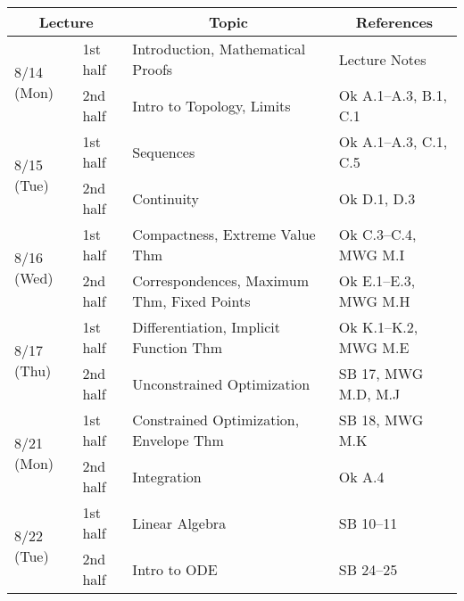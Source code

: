 \documentclass[11pt]{article}
\begin{document}
\begin{tabularx}{\columnwidth}{llll}
  \toprule
  \multicolumn{2}{c}{Lecture}
  &
  \multicolumn{1}{c}{Topic}
  &
  \multicolumn{1}{c}{References}
                                                                                                                 \\\midrule
  \multirow{2}{*}{8/14 (Mon)} & 1st half & Introduction, Mathematical Proofs          & Lecture Notes         \\
                              & 2nd half & Intro to Topology, Limits                  & Ok A.1--A.3, B.1, C.1 \\ [6pt]
  \multirow{2}{*}{8/15 (Tue)} & 1st half & Sequences                                  & Ok A.1--A.3, C.1, C.5 \\
                              & 2nd half & Continuity                                 & Ok D.1, D.3           \\ [6pt]
  \multirow{2}{*}{8/16 (Wed)} & 1st half & Compactness, Extreme Value Thm             & Ok C.3--C.4, MWG M.I  \\ 
                              & 2nd half & Correspondences, Maximum Thm, Fixed Points & Ok E.1--E.3, MWG M.H  \\ [6pt]
  \multirow{2}{*}{8/17 (Thu)} & 1st half & Differentiation, Implicit Function Thm     & Ok K.1--K.2, MWG M.E  \\
                              & 2nd half & Unconstrained Optimization                 & SB 17, MWG M.D, M.J   \\ [6pt]
  \multirow{2}{*}{8/21 (Mon)} & 1st half & Constrained Optimization, Envelope Thm     & SB 18, MWG M.K        \\
                              & 2nd half & Integration                                & Ok A.4                \\ [6pt]
  \multirow{2}{*}{8/22 (Tue)} & 1st half & Linear Algebra                             & SB 10--11             \\
                              & 2nd half & Intro to ODE                               & SB 24--25             \\
  \bottomrule
\end{tabularx}

\end{document}
